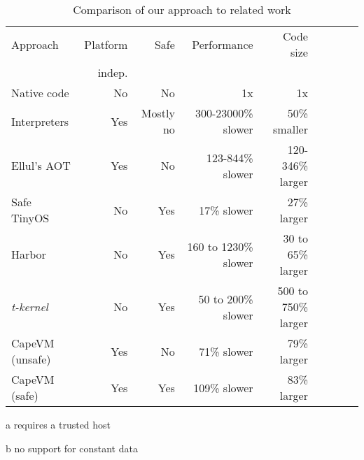 
\begin{table}
\caption{Comparison of our approach to related work}
\label{tbl-contribution-comparison}
    \begin{threeparttable}
    \begin{tabular}{lrrrrrrrr}
    \toprule
    Approach        & Platform    & Safe               & Performance           & Code size                  \\
                    & indep.      &                    &                       &                            \\
    \midrule
    \midrule
    Native code     & No          & No                 & 1x                    & 1x                         \\
    Interpreters    & Yes         & Mostly no          & 300-23000\% slower    & ~50\% smaller \tnote{b}    \\
    Ellul's AOT     & Yes         & No                 & 123-844\% slower      & 120-346\% larger \tnote{b} \\
    Safe TinyOS     & No          & Yes \tnote{a}      & 17\% slower           & 27\% larger                \\
    Harbor          & No          & Yes                & 160 to 1230\% slower  & 30 to 65\% larger          \\
    \emph{t-kernel} & No          & Yes                & 50 to 200\% slower    & 500 to 750\% larger        \\
    CapeVM (unsafe) & Yes         & No                 & 71\% slower           & 79\% larger                \\ %
    CapeVM (safe)   & Yes         & Yes                & 109\% slower          & 83\% larger                \\ %
    \bottomrule
    \end{tabular}
    \begin{tablenotes}
        \item[a] requires a trusted host
        \item[b] no support for constant data
    \end{tablenotes}
    \end{threeparttable}
\end{table}
